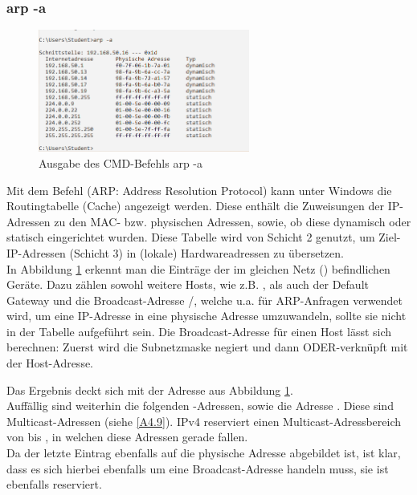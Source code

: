 \subsubsection{arp -a}\label{A3.2.2}
\begin{figure}[H]
  \begin{center}
      \includegraphics[width=0.618\textwidth]{graphics/versuch/3_2/arp_a}
      \caption{Ausgabe des CMD-Befehls arp -a}\label{abb_arp}
  \end{center}
\end{figure}

Mit dem Befehl  (ARP: Address Resolution Protocol) kann unter Windows die Routingtabelle (Cache) angezeigt werden. Diese enthält die Zuweisungen der IP-Adressen zu den MAC- bzw. physischen Adressen, sowie, ob diese dynamisch oder statisch eingerichtet wurden. Diese Tabelle wird von Schicht 2 genutzt, um Ziel-IP-Adressen (Schicht 3) in (lokale) Hardwareadressen zu übersetzen.\\

In Abbildung \ref{abb_arp} erkennt man die Einträge der im gleichen Netz () befindlichen Geräte. Dazu zählen sowohl weitere Hosts, wie z.B. , als auch der Default Gateway und die Broadcast-Adresse /, welche u.a. für ARP-Anfragen verwendet wird, um eine IP-Adresse in eine physische Adresse umzuwandeln, sollte sie nicht in der Tabelle aufgeführt sein. Die Broadcast-Adresse für einen Host lässt sich berechnen: Zuerst wird die Subnetzmaske negiert und dann ODER-verknüpft mit der Host-Adresse.

\begin{figure}[H]
\centering
{}
\end{figure}

Das Ergebnis deckt sich mit der Adresse aus Abbildung \ref{abb_arp}.\\

Auffällig sind weiterhin die folgenden -Adressen, sowie die Adresse . Diese sind Multicast-Adressen (siehe \ref{A4.9}). IPv4 reserviert einen Multicast-Adressbereich von  bis , in welchen diese Adressen gerade fallen.\\

Da der letzte Eintrag ebenfalls auf die physische Adresse  abgebildet ist, ist klar, dass es sich hierbei ebenfalls um eine Broadcast-Adresse handeln muss, sie ist ebenfalls reserviert.
